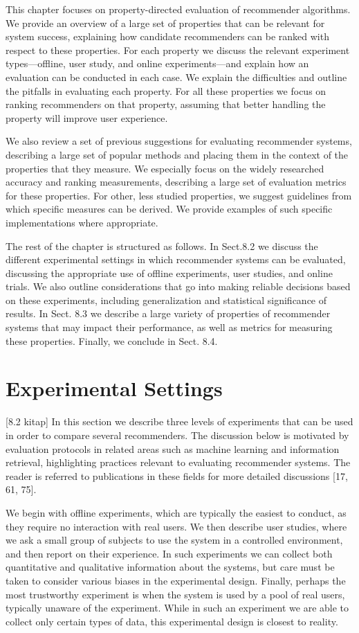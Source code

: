 This chapter focuses on property-directed evaluation of recommender algorithms. We provide an overview of a large set of properties that can be relevant for system success, explaining how candidate recommenders can be ranked with respect to these properties. For each property we discuss the relevant experiment types—offline, user study, and online experiments—and explain how an evaluation can be conducted in each case. We explain the difficulties and outline the pitfalls in evaluating each property. For all these properties we focus on ranking recommenders on that property, assuming that better handling the property will improve user experience.

We also review a set of previous suggestions for evaluating recommender systems, describing a large set of popular methods and placing them in the context of the properties that they measure. We especially focus on the widely researched accuracy and ranking measurements, describing a large set of evaluation metrics for these properties. For other, less studied properties, we suggest guidelines from which specific measures can be derived. We provide examples of such specific implementations where appropriate.

The rest of the chapter is structured as follows. In Sect.8.2 we discuss the different experimental settings in which recommender systems can be evaluated, discussing the appropriate use of offline experiments, user studies, and online trials. We also outline considerations that go into making reliable decisions based on these experiments, including generalization and statistical significance of results. In Sect. 8.3 we describe a large variety of properties of recommender systems that may impact their performance, as well as metrics for measuring these properties. Finally, we conclude in Sect. 8.4.

\section{Experimental Settings}
[8.2 kitap]
In this section we describe three levels of experiments that can be used in order to compare several recommenders. The discussion below is motivated by evaluation protocols in related areas such as machine learning and information retrieval, highlighting practices relevant to evaluating recommender systems. The reader is referred to publications in these fields for more detailed discussions [17, 61, 75].

We begin with offline experiments, which are typically the easiest to conduct, as they require no interaction with real users. We then describe user studies, where we ask a small group of subjects to use the system in a controlled environment, and then report on their experience. In such experiments we can collect both quantitative and qualitative information about the systems, but care must be taken to consider various biases in the experimental design. Finally, perhaps the most trustworthy experiment is when the system is used by a pool of real users, typically unaware of the experiment. While in such an experiment we are able to collect only certain types of data, this experimental design is closest to reality.

